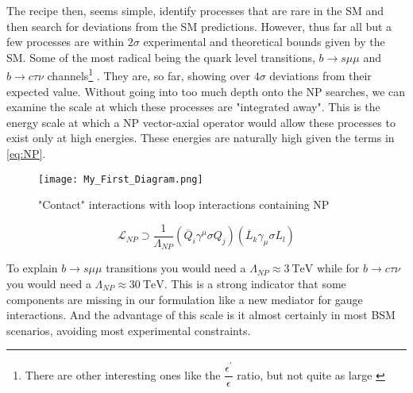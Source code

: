 The recipe then, seems simple, identify processes that are rare in the SM and then search for deviations from the SM predictions.
%
However, thus far all but a few processes are within $2\sigma$ experimental and theoretical bounds given by the SM. 
%
Some of the most radical being the quark level transitions, $b \rightarrow s \mu \mu$ \cite{DAmico2017,Geng_2017} and $b \rightarrow c \tau \nu$ channels\footnote{There are other interesting ones like the $\dfrac{\epsilon^\prime}{\epsilon}$ ratio, but not quite as large \cite{Buras2015}} \cite{Fajfer_2012}. 
%
They are, so far, showing over $ 4 \sigma$ deviations from their expected value. 
%
Without going into too much depth onto the NP searches, we can examine the scale at which these processes are "integrated away". 
%
This is the energy scale at which a NP vector-axial operator would allow these processes to exist only at high energies. These energies are naturally high given the terms in \ref{eq:NP}. 
%
\bigbreak
%
\noindent\begin{minipage}{.35\textwidth}
	\begin{figure}[H]
		\label{fig:contactNP}
		\centering
		\texttt{[image: My\_First\_Diagram.png]}
		\caption{"Contact" interactions with loop interactions containing NP}
	\end{figure}
\end{minipage}
\begin{minipage}{.6\textwidth}
\begin{equation}
\label{eq:NP}
\mathcal{L}_{NP} \supset \frac{1}{\Lambda_{NP}} (\overline{Q}_i \gamma^\mu \sigma Q_j ) (\overline{L}_k \gamma_\mu \sigma L_l) 
\end{equation}
\end{minipage}
%
\bigbreak
%
To explain $b \rightarrow s \mu \mu$ transitions you would need a $\Lambda_{NP} \approx 3 \ \text{TeV}$ while for $b \rightarrow c \tau \nu$ you would need a $\Lambda_{NP} \approx 30\ \text{TeV}$. This is a strong indicator that some components are missing in our formulation like a new mediator for gauge interactions. And the advantage of this scale is it almost certainly in most BSM scenarios, avoiding most experimental constraints.

